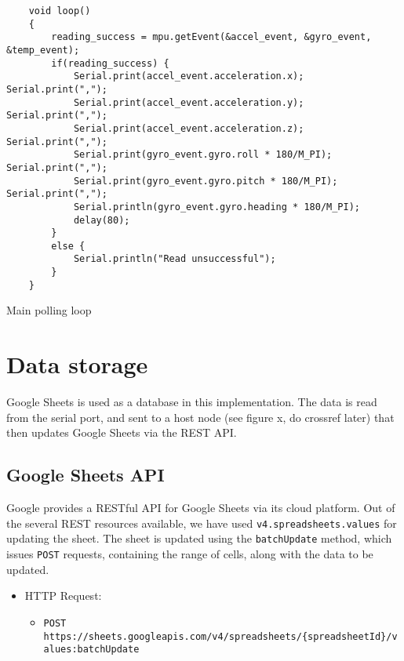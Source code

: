 \documentclass[./main.tex]{subfiles}
\begin{document}
\begin{code}
    \begin{verbatim}
    void loop()
    {
        reading_success = mpu.getEvent(&accel_event, &gyro_event, &temp_event);
        if(reading_success) {
            Serial.print(accel_event.acceleration.x); Serial.print(",");
            Serial.print(accel_event.acceleration.y); Serial.print(",");
            Serial.print(accel_event.acceleration.z); Serial.print(",");
            Serial.print(gyro_event.gyro.roll * 180/M_PI); Serial.print(",");
            Serial.print(gyro_event.gyro.pitch * 180/M_PI); Serial.print(",");
            Serial.println(gyro_event.gyro.heading * 180/M_PI);
            delay(80);
        }
        else {
            Serial.println("Read unsuccessful");
        }
    }
    \end{verbatim}
    \caption{Main polling loop}
    \label{code:ucloop}
\end{code}
\vspace{0.5cm}

\section{Data storage}
Google Sheets is used as a database in this implementation. The data is read
from the serial port, and sent to a host node (see figure x, do crossref later)
that then updates Google Sheets via the REST API.

\subsection{Google Sheets API}
Google provides a RESTful API for Google Sheets via its cloud platform. Out of
the several REST resources available, we have used
\texttt{v4.spreadsheets.values} for updating the sheet. The sheet is
updated using the \texttt{batchUpdate} method, which issues
\texttt{POST} requests, containing the range of cells, along with the
data to be updated.

\begin{itemize}
    \item HTTP Request:
        \begin{itemize}
            \item {\small \texttt{POST https://sheets.googleapis.com/v4/spreadsheets/\{spreadsheetId\}/values:batchUpdate}}
        \end{itemize}
\end{itemize}
\end{document}
